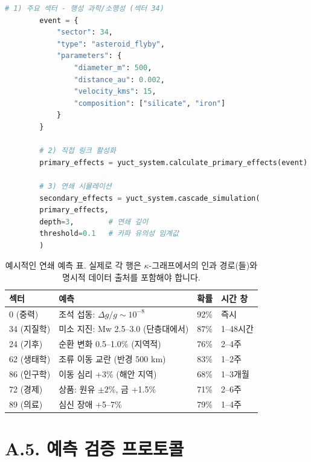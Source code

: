 \documentclass[13pt,a4paper]{article}
\begin{document}
	\begin{lstlisting}[language=Python]
		# 1) 주요 섹터 - 행성 과학/소행성 (섹터 34)
		event = {
			"sector": 34,
			"type": "asteroid_flyby",
			"parameters": {
				"diameter_m": 500,
				"distance_au": 0.002,
				"velocity_kms": 15,
				"composition": ["silicate", "iron"]
			}
		}
		
		# 2) 직접 링크 활성화
		primary_effects = yuct_system.calculate_primary_effects(event)
		
		# 3) 연쇄 시뮬레이션
		secondary_effects = yuct_system.cascade_simulation(
		primary_effects,
		depth=3,        # 연쇄 깊이
		threshold=0.1   # 카파 유의성 임계값
		)
	\end{lstlisting}
	
	\begin{table}[htbp]
		\centering
		\small
		\begin{tabular}{p{}p{}p{}p{}}
			\toprule
			\textbf{섹터} & \textbf{예측} & \textbf{확률} & \textbf{시간 창} \\
			\midrule
			0 (중력) & 조석 섭동: $\Delta g/g \sim 10^{-8}$ & 92\% & 즉시 \\
			34 (지질학) & 미소 지진: Mw 2.5--3.0 (단층대에서) & 87\% & 1--48시간 \\
			24 (기후) & 순환 변화 0.5--1.0\% (지역적) & 76\% & 2--4주 \\
			62 (생태학) & 조류 이동 교란 (반경 500 km) & 83\% & 1--2주 \\
			86 (인구학) & 이동 심리 +3\% (해안 지역) & 68\% & 1--3개월 \\
			72 (경제) & 상품: 원유 $\pm 2\%$, 금 +1.5\% & 71\% & 2--6주 \\
			89 (의료) & 심신 장애 +5--7\% & 79\% & 1--4주 \\
			\bottomrule
		\end{tabular}
		\caption{예시적인 연쇄 예측 표. 실제로 각 행은 $\kappa$-그래프에서의 인과 경로(들)와 명시적 데이터 출처를 포함해야 합니다.}
	\end{table}
	
	\section*{A.5. 예측 검증 프로토콜}
	
\end{document}
